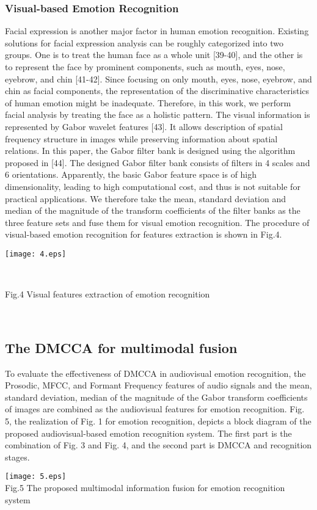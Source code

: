 \documentclass[journal]{IEEEtran}
\begin{document}
\subsubsection{Visual-based Emotion Recognition}
Facial expression is another major factor in human emotion recognition. Existing solutions for facial expression analysis can be roughly categorized into two groups. One is to treat the human face as a whole unit [39-40], and the other is to represent the face by prominent components, such as mouth, eyes, nose, eyebrow, and chin [41-42]. Since focusing on only mouth, eyes, nose, eyebrow, and chin as facial components, the representation of the discriminative characteristics of human emotion might be inadequate. Therefore, in this work, we perform facial analysis by treating the face as a holistic pattern. The visual information is represented by Gabor wavelet features [43]. It allows description of spatial frequency structure in images while preserving information about spatial relations. In this paper, the Gabor filter bank is designed using the algorithm proposed in [44]. The designed Gabor filter bank consists of filters in 4 scales and 6 orientations. Apparently, the basic Gabor feature space is of high dimensionality, leading to high computational cost, and thus is not suitable for practical applications. We therefore take the mean, standard deviation and median of the magnitude of the transform coefficients of the filter banks as the three feature sets and fuse them for visual emotion recognition. The procedure of visual-based emotion recognition for features extraction is shown in Fig.4.
\centerline {\texttt{[image: 4.eps]}}\\  \centerline {Fig.4  Visual features extraction of emotion recognition}\\
\subsection{The DMCCA for multimodal fusion}
To evaluate the effectiveness of DMCCA in audiovisual emotion recognition, the Prosodic, MFCC, and Formant Frequency features of audio signals and the mean, standard deviation, median of the magnitude of the Gabor transform coefficients of images are combined as the audiovisual features for emotion recognition. Fig. 5, the realization of Fig. 1 for emotion recognition, depicts a block diagram of the proposed audiovisual-based emotion recognition system. The first part is the combination of Fig. 3 and Fig. 4, and the second part is DMCCA and recognition stages.
\begin{figure*}[t]
\centering
\texttt{[image: 5.eps]}\\ Fig.5 The proposed multimodal information fusion for emotion recognition system \\
\end{figure*}
\end{document}
